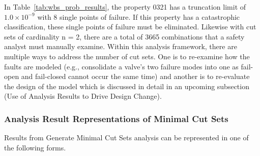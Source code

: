 In Table~\ref{tab:wbs_prob_results}, the property 0321 has a truncation limit of $1.0 \times 10^{-9}$ with 8 single points of failure. If this property has a catastrophic classification, these single points of failure must be eliminated. Likewise with cut sets of cardinality n = 2, there are a total of 3665 combinations that a safety analyst must manually examine. Within this analysis framework, there are multiple ways to address the number of cut sets. One is to re-examine how the faults are modeled (e.g., consolidate a valve's two failure modes into one as fail-open and fail-closed cannot occur the same time) and another is to re-evaluate the design of the model which is discussed in detail in an upcoming subsection (Use of Analysis Results to Drive Design Change). 

\subsubsection{Analysis Result Representations of Minimal Cut Sets}
Results from Generate Minimal Cut Sets analysis can be represented in one of the following forms.
